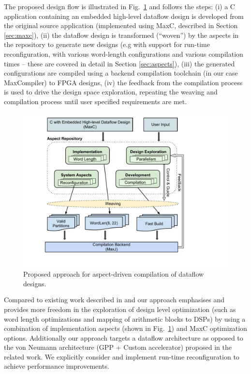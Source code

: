 The proposed design flow is illustrated in Fig.~\ref{fig:design-flow} and follows the steps: (i) a C application
containing an embedded high-level dataflow design is developed from
the original source application (implemented using MaxC, described in
Section \ref{sec:maxc}), (ii) the dataflow design is transformed
(``woven'') by the aspects in the repository to generate new designs
(e.g with support for run-time reconfiguration, with various
word-length configurations and various compilation times -- these are
covered in detail in Section \ref{sec:aspects}), (iii) the generated
configurations are compiled using a backend compilation toolchain (in
our case MaxCompiler) to FPGA designs, (iv) the feedback from the
compilation process is used to drive the design space exploration,
repeating the weaving and compilation process until user specified
requirements are met.

\begin{figure}[!h]
  \includegraphics[scale=0.48, trim=60 50 0 0]{figs/design-flow}
  \caption{Proposed approach for aspect-driven compilation of dataflow
    designs.}
  \label{fig:design-flow}
\end{figure}

Compared to existing work described in
\cite{Cardoso:Teixeira:Alves:Nobre:Diniz:Cutinho:Luk:2012} and
\cite{cardoso2011new} our approach emphasises and provides more
freedom in the exploration of design level optimization (such as word
length optimizations and mapping of arithmetic blocks to DSPs) by
using a combination of implementation aspects (shown in Fig.~\ref{fig:design-flow}) and MaxC optimization options.  Additionally
our approach targets a dataflow architecture as opposed to the von
Neumann architecture (GPP + Custom accelerator) proposed in the
related work. We explicitly consider and implement run-time
reconfiguration to achieve performance improvements.
